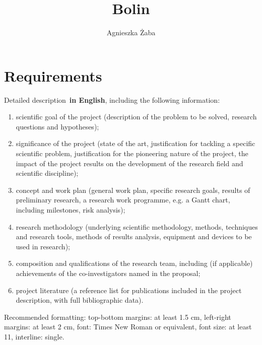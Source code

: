 \documentclass[11pt,a4paper]{article}
\title{Bolin}
\author{Agnieszka Żaba}
\begin{document}
\section{Requirements}
Detailed description \textbf{in English}, including the following information: 

\begin{enumerate}
\item scientific goal of the project (description of the problem to be solved, research questions and hypotheses); 
\item significance of the project (state of the art, justification for tackling a specific scientific problem,
    justification for the pioneering nature of the project,
    the impact of the project results on the development of the research field and scientific discipline); 
\item concept and work plan (general work plan, specific research goals, results of preliminary research,
    a research work programme, e.g. a Gantt chart, including milestones, risk analysis); 
\item research methodology (underlying scientific methodology, methods, techniques and research tools,
    methods of results analysis, equipment and devices to be used in research); 
\item composition and qualifications of the research team, including (if applicable) achievements
    of the co-investigators named in the proposal; 
\item project literature (a reference list for publications included in the project description,
    with full bibliographic data). 
\end{enumerate}
Recommended formatting: top-bottom margins: at least 1.5 cm, left-right margins: at least 2 cm, font: Times New Roman or equivalent, font size: at least 11, interline: single. 
\end{document}
